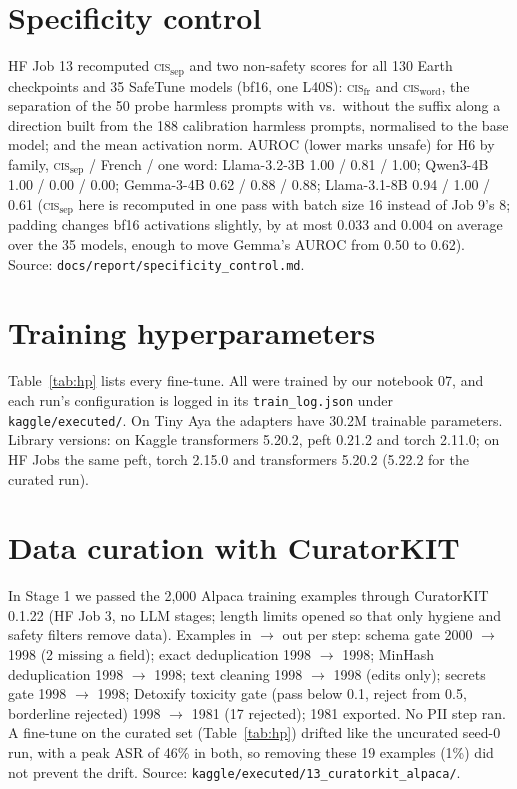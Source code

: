 \documentclass[11pt]{article}
\newcommand{\cissep}{\textsc{cis}$_{\text{sep}}$}
\begin{document}
\section{Specificity control}
\label{app:spec}

HF Job 13 recomputed \cissep{} and two non-safety scores for all 130 Earth checkpoints and 35 SafeTune models (bf16,
one L40S): \textsc{cis}$_{\text{fr}}$ and \textsc{cis}$_{\text{word}}$, the separation of the 50 probe harmless prompts
with vs.\ without the suffix along a direction built from the 188 calibration harmless prompts, normalised to the base
model; and the mean activation norm. AUROC (lower marks unsafe) for H6 by family, \cissep{} / French / one word:
Llama-3.2-3B 1.00 / 0.81 / 1.00; Qwen3-4B 1.00 / 0.00 / 0.00; Gemma-3-4B 0.62 / 0.88 / 0.88; Llama-3.1-8B 0.94 / 1.00 /
0.61 (\cissep{} here is recomputed in one pass with batch size 16 instead of Job 9's 8; padding changes bf16 activations
slightly, by at most 0.033 and 0.004 on average over the 35 models, enough to move Gemma's AUROC from 0.50 to 0.62). Source:
\texttt{docs/report/specificity\_control.md}.



\section{Training hyperparameters}
\label{app:hp}

Table~\ref{tab:hp} lists every fine-tune. All were trained by our notebook 07, and each run's configuration is
logged in its \texttt{train\_log.json} under \texttt{kaggle/executed/}. On Tiny Aya the adapters have 30.2M trainable
parameters. Library versions: on Kaggle transformers 5.20.2, peft 0.21.2 and torch 2.11.0; on HF Jobs the same peft,
torch 2.15.0 and transformers 5.20.2 (5.22.2 for the curated run).

\section{Data curation with CuratorKIT}
\label{app:curation}

In Stage 1 we passed the 2,000 Alpaca training examples through CuratorKIT 0.1.22 \citep{bhattacharjee2026curatorkit}
(HF Job 3, no LLM stages; length limits opened so that only hygiene and safety filters remove data). Examples in
$\rightarrow$ out per step: schema gate 2000 $\rightarrow$ 1998 (2 missing a field); exact deduplication 1998
$\rightarrow$ 1998; MinHash deduplication 1998 $\rightarrow$ 1998; text cleaning 1998 $\rightarrow$ 1998 (edits
only); secrets gate 1998 $\rightarrow$ 1998; Detoxify toxicity gate (pass below 0.1, reject from 0.5, borderline
rejected) 1998 $\rightarrow$ 1981 (17 rejected); 1981 exported. No PII step ran. A fine-tune on the curated set
(Table~\ref{tab:hp}) drifted like the uncurated seed-0 run, with a peak ASR of 46\% in both, so removing these 19
examples (1\%) did not prevent the drift. Source: \texttt{kaggle/executed/13\_curatorkit\_alpaca/}.
\end{document}
